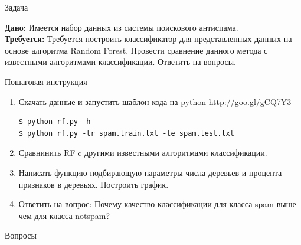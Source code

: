 \documentclass[10pt]{beamer}
\begin{document}
\begin{frame}[fragile]{Задача}

{\bf Дано:} Имеется набор данных из системы поискового антиспама. \\
{\bf Требуется:} Требуется построить классификатор для представленных данных
на основе алгоритма Random Forest. Провести сравнение данного метода с
известными алгоритмами классификации. Ответить на вопросы.

\vspace{1em}
Пошаговая инструкция
\begin{enumerate}
    \item Скачать данные и запустить шаблон кода на python
    \url{http://goo.gl/gCQ7Y3}
\begin{shaded}
{\color{green} \begin{verbatim}
$ python rf.py -h
$ python rf.py -tr spam.train.txt -te spam.test.txt
\end{verbatim}}
\end{shaded}
    \item Сравнинить RF c другими известными алгоритмами классификации.
    \item Написать функцию подбирающую параметры числа деревьев и процента
    признаков в деревьях. Построить график.
    \item Ответить на вопрос: Почему качество классификации для класса spam выше
    чем для класса notspam?
\end{enumerate}

\end{frame}

\begin{frame}[plain]
\begin{center}
{\Large Вопросы}
\end{center}
\end{frame}
\end{document}
